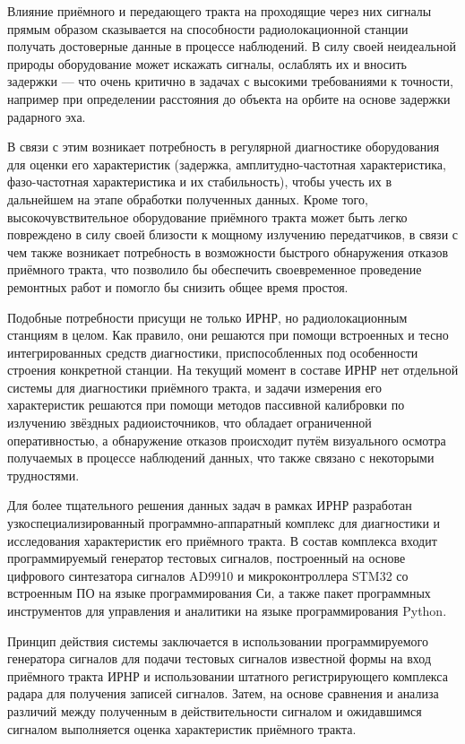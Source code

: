 \documentclass{report}
\begin{document}
Влияние приёмного и передающего тракта на проходящие через них сигналы прямым образом сказывается на способности радиолокационной станции получать достоверные данные в процессе наблюдений. В силу своей неидеальной природы оборудование может искажать сигналы, ослаблять их и вносить задержки --- что очень критично в задачах с высокими требованиями к точности, например при определении расстояния до объекта на орбите на основе задержки радарного эха.

В связи с этим возникает потребность в регулярной диагностике оборудования для оценки его характеристик (задержка, амплитудно-частотная характеристика, фазо-частотная характеристика и их стабильность), чтобы учесть их в дальнейшем на этапе обработки полученных данных. Кроме того, высокочувствительное оборудование приёмного тракта может быть легко повреждено в силу своей близости к мощному излучению передатчиков, в связи с чем также возникает потребность в возможности быстрого обнаружения отказов приёмного тракта, что позволило бы обеспечить своевременное проведение ремонтных работ и помогло бы снизить общее время простоя.

Подобные потребности присущи не только ИРНР, но радиолокационным станциям в целом. Как правило, они решаются при помощи встроенных и тесно интегрированных средств диагностики, приспособленных под особенности строения конкретной станции. На текущий момент в составе ИРНР нет отдельной системы для диагностики приёмного тракта, и задачи измерения его характеристик решаются при помощи методов пассивной калибровки по излучению звёздных радиоисточников, что обладает ограниченной оперативностью, а обнаружение отказов происходит путём визуального осмотра получаемых в процессе наблюдений данных, что также связано с некоторыми трудностями.

Для более тщательного решения данных задач в рамках ИРНР разработан узкоспециализированный программно-аппаратный комплекс для диагностики и исследования характеристик его приёмного тракта. В состав комплекса входит программируемый генератор тестовых сигналов, построенный на основе цифрового синтезатора сигналов AD9910 и микроконтроллера STM32 со встроенным ПО на языке программирования Си, а также пакет программных инструментов для управления и аналитики на языке программирования Python.

Принцип действия системы заключается в использовании программируемого генератора сигналов для подачи тестовых сигналов известной формы на вход приёмного тракта ИРНР и использовании штатного регистрирующего комплекса радара для получения записей сигналов. Затем, на основе сравнения и анализа различий между полученным в действительности сигналом и ожидавшимся сигналом выполняется оценка характеристик приёмного тракта.
\end{document}
